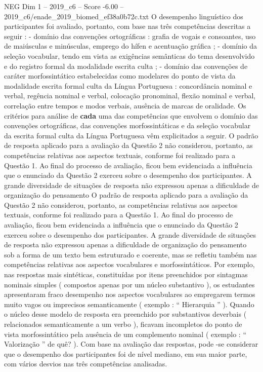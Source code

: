 \begin{textsample}{NEG Dim 1 – 2019\_c6 – Score -6.00 – 2019\_c6/enade\_2019\_biomed\_ef38a0b72c.txt}
O desempenho linguístico dos participantes foi avaliado, portanto, com base nas três competências descritas a seguir : - domínio das convenções ortográficas : grafia de vogais e consoantes, uso de maiúsculas e minúsculas, emprego do hífen e acentuação gráfica ; - domínio da seleção vocabular, tendo em vista as exigências semânticas do tema desenvolvido e do registro formal da modalidade escrita culta ; - domínio das convenções de caráter morfossintático estabelecidas como modelares do ponto de vista da modalidade escrita formal culta da Língua Portuguesa : concordância nominal e verbal, regência nominal e verbal, colocação pronominal, flexão nominal e verbal, correlação entre tempos e modos verbais, ausência de marcas de oralidade.
Os critérios para análise de \textbf{cada} uma das competências que envolvem o domínio das convenções ortográficas, das convenções morfossintáticas e da seleção vocabular da escrita formal culta da Língua Portuguesa vêm explicitados a seguir.
O padrão de resposta aplicado para a avaliação da Questão 2 não considerou, portanto, as competências relativas aos aspectos textuais, conforme foi realizado para a Questão 1.
Ao final do processo de avaliação, ficou bem evidenciada a influência que o enunciado da Questão 2 exerceu sobre o desempenho dos participantes.
A grande diversidade de situações de resposta não expressou apenas a dificuldade de organização do pensamento O padrão de resposta aplicado para a avaliação da Questão 2 não considerou, portanto, as competências relativas aos aspectos textuais, conforme foi realizado para a Questão 1.
Ao final do processo de avaliação, ficou bem evidenciada a influência que o enunciado da Questão 2 exerceu sobre o desempenho dos participantes.
A grande diversidade de situações de resposta não expressou apenas a dificuldade de organização do pensamento sob a forma de um texto bem estruturado e coerente, mas se refletiu também nas competências relativas aos aspectos vocabulares e morfossintáticos.
Por exemplo, nas respostas mais sintéticas, constituídas por itens preenchidos por sintagmas nominais simples ( compostos apenas por um núcleo substantivo ), os estudantes apresentaram fraco desempenho nos aspectos vocabulares ao empregarem termos muito vagos ou imprecisos semanticamente ( exemplo : “ Hierarquia ” ).
Quando o núcleo desse modelo de resposta era preenchido por substantivos deverbais ( relacionados semanticamente a um verbo ), ficavam incompletos do ponto de vista morfossintático pela ausência de um complemento nominal ( exemplo : “ Valorização ” de quê? ).
Com base na avaliação das respostas, pode -se considerar que o desempenho dos participantes foi de nível mediano, em sua maior parte, com vários desvios nas três competências analisadas.

\end{textsample}
